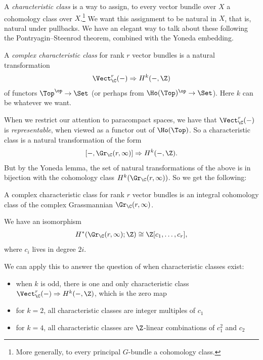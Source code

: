 \documentclass[11pt]{book}
\begin{document}
A \emph{characteristic class} is a way to assign, to every vector bundle over $X$ a cohomology class over $X$.\footnote{More generally, to every principal $G$-bundle a cohomology class.} We want this assignment to be natural in $X$, that is, natural under pullbacks. We have an elegant way to talk about these following the Pontryagin--Steenrod theorem, combined with the Yoneda embedding. 

\begin{definition}\label{def:complex-characteristic-class} A \emph{complex characteristic class} for rank $r$ vector bundles is a natural transformation
\begin{align*}
    \Vect_\C^r(-) \Rightarrow H^k(-,\Z)
\end{align*}
of functors $\Top^\op \to \Set$ (or perhaps from $\Ho(\Top)^\op \to \Set$). Here $k$ can be whatever we want.
\end{definition}

When we restrict our attention to paracompact spaces, we have that $\Vect_\C^r(-)$ is \emph{representable}, when viewed as a functor out of $\Ho(\Top)$. So a characteristic class is a natural transformation of the form
\begin{align*}
    \left[ -,\Gr_\C(r,\infty) \right] \Rightarrow H^k(-,\Z).
\end{align*}
%
But by the Yoneda lemma, the set of natural transformations of the above is in bijection with the cohomology class $H^k(\Gr_\C(r,\infty))$. So we get the following:

\begin{slogan} A complex characteristic class for rank $r$ vector bundles is an integral cohomology class of the complex Grassmannian $\Gr_\C(r,\infty)$.
\end{slogan}

\begin{theorem}[Borel]
We have an isomorphism
\begin{align*}
    H^\ast(\Gr_\C(r,\infty);\Z) \cong \Z[c_1, \ldots, c_r],
\end{align*}
where $c_i$ lives in degree $2i$.
\end{theorem}

We can apply this to answer the question of when characteristic classes exist:
\begin{itemize}
    \item when $k$ is odd, there is one and only characteristic class $\Vect_\C^r(-) \Rightarrow H^k(-,\Z)$, which is the zero map
    \item for $k=2$, all characteristic classes are integer multiples of $c_1$
    \item for $k=4$, all characteristic classes are $\Z$-linear combinations of $c_1^2$ and $c_2$
\end{itemize}
\end{document}
